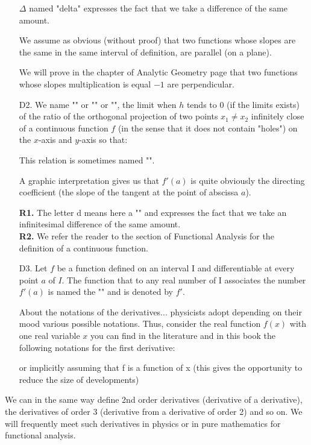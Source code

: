 \begin{enumerate}
	\begin{tcolorbox}[title=Remark,colframe=black,arc=10pt]
$\Delta$ named "delta" expresses the fact that we take a difference of the same amount.
	\end{tcolorbox}
We assume as obvious (without proof) that two functions whose slopes are the same in the same interval of definition, are parallel (on a plane).
	\begin{tcolorbox}[title=Remark,colframe=black,arc=10pt]
We will prove in the chapter of Analytic Geometry page \pageref{equation of the straight line} that two functions whose slopes multiplication is equal $-1$ are perpendicular.
	\end{tcolorbox}
	\item[D2.] We name "" or "" or "", the limit when $h$ tends to $0$ (if the limits exists) of the ratio of the orthogonal projection of two points $x_1\neq x_2$ infinitely close  of a continuous function $f$ (in the sense that it does not contain "holes") on the $x$-axis and $y$-axis so that:
	
	This relation is sometimes named "".
	
	A graphic interpretation gives us that $f'(a)$ is quite obviously the directing coefficient (the slope of the tangent at the point of abscissa $a$).
	\begin{tcolorbox}[title=Remarks,colframe=black,arc=10pt]
	\textbf{R1.} The letter $\mathrm{d}$ means here a "" and expresses the fact that we take an infinitesimal difference of the same amount.\\

	\textbf{R2.} We refer the reader to the section of Functional Analysis for the definition of a continuous function.
	\end{tcolorbox}
	\item[D3.] Let $f$ be a function defined on an interval I and differentiable at every point $a$ of $I$. The function that to any real number of I associates the number $f'(a)$ is named the "" and is denoted by $f'$.
	\begin{tcolorbox}[title=Remark,colframe=black,arc=10pt]
About the notations of the derivatives... physicists adopt depending on their mood various possible notations. Thus, consider the real function $f(x)$  with one real variable $x$ you can find in the literature and in this book the following notations for the first derivative:
	
or implicitly assuming that f is a function of x (this gives the opportunity to reduce the size of developments)
	
	\end{tcolorbox}
\end{enumerate}
We can in the same way define 2nd order derivatives (derivative of a derivative), the derivatives of order 3 (derivative from a derivative of order 2) and so on. We will  frequently meet such derivatives in physics or in pure mathematics for functional analysis.

